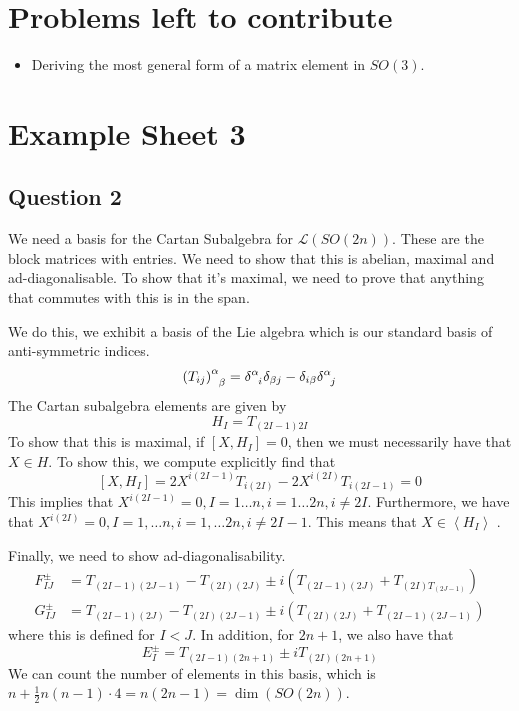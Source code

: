 \section{Problems left to contribute}
\begin{itemize}
	\item Deriving the most general form of a matrix element in $SO(3)$. 
\end{itemize}


\section{Example Sheet 3} 

\subsection{Question 2} 
We need a basis for the Cartan Subalgebra for $ \mathcal{ L } ( SO ( 2n ) ) $. 
These are the block matrices with entries. 
We need to show that this is abelian, maximal and ad-diagonalisable. 
To show that it's maximal, we need to prove that 
anything that commutes with this is in the span. 

We do this, we exhibit a basis of the Lie algebra 
which is our standard basis of anti-symmetric indices. 
\[
	\left( T _{ ij }  \right) \indices{^ \alpha _ \beta }  = \delta \indices{ ^ \alpha _ i } 
	\delta _{ \beta j  }  - \delta _{ i \beta } \delta \indices{ ^ \alpha _ j } 
\]  The Cartan subalgebra 
elements are given by 
\[
	H _ I = T _{ ( 2 I - 1) 2 I  } 
\] To show that this is maximal, if $ \left[  X, H _ I  \right]   = 0 $, 
then we must necessarily have that $ X \in H  $. 
To show this, we 
compute explicitly find that 
\[
	[ X , H _ I ]  = 2 X ^{ i ( 2 I - 1 ) } T _{ i ( 2I ) }  - 2 X ^{ i ( 2 I ) } T _{ i ( 2 I - 1 ) } =0 
\] This implies that $ X ^{ i ( 2 I - 1) }  =0 , I = 1 \dots n , i = 1 \dots 2n , i \neq 2 I $. 
Furthermore, we have that $ X ^{ i ( 2I )   }  =0  , I =  1, \dots n , i  = 1 , \dots 2n , i \neq 2 I - 1$. 
This means that $ X \in \left< H _ I  \right>$ . 

Finally, we need to show ad-diagonalisability.
\begin{align*}
	F_{ IJ } ^{ \pm }  & = T _{ \left( 2 I - 1  \right)  \left( 2 J - 1 \right)  } - T _{ \left( 2I  \right)  \left( 
	2 J \right)  } \pm i ( T_{ \left(  2 I - 1  \right)  \left( 2 J  \right)  } 
	+ T _{ \left( 2 I  \right)  T _{ \left(  2J - 1 \right)  } } ) \\
			G^{ \pm } _{ IJ }  & = T _{ \left( 2 I - 1   \right)  \left(  2J  \right)  } - T _{ \left( 2 I  \right) 
	\left( 2 J - 1  \right)  } \pm i \left( T _{ \left(  2I  \right)  \left(  2 J  \right)  } 
+ T _{ \left(  2I - 1  \right) \left( 2J - 1 \right)  } \right)  
\end{align*} where this is defined for $ I < J $. 
In addition, for $ 2n + 1 $, we also have that \[
	E _ I ^{ \pm } = T_{ \left( 2 I  - 1 \right)  \left(  2 n + 1  \right)  } \pm i T _{ \left(  2I  \right)  
	\left(  2n + 1  \right) }
\] We can count the number of elements in this basis, 
which is $ n + \frac{1}{2 } n ( n - 1) \cdot  4  = n  ( 2 n - 1 )  = \dim ( SO ( 2n ) ) $. 

